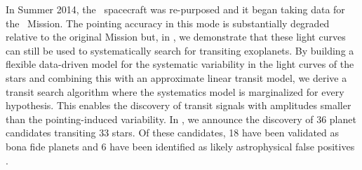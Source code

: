 In Summer 2014, the \kepler\ spacecraft was re-purposed and it began taking
data for the \KT\ Mission.
The pointing accuracy in this mode is substantially degraded relative to the
original Mission but, in , we demonstrate that these light curves
can still be used to systematically search for transiting exoplanets.
By building a flexible data-driven model for the systematic variability in the
light curves of the stars and combining this with an approximate linear
transit model, we derive a transit search algorithm where the systematics
model is marginalized for every hypothesis.
This enables the discovery of transit signals with amplitudes smaller than the
pointing-induced variability.
In , we announce the discovery of 36 planet candidates transiting
33 stars.
Of these candidates, 18 have been validated as bona fide planets and 6 have
been identified as likely astrophysical false positives
\citep{Crossfield:2015, Montet:2015, Armstrong:2015a}.

